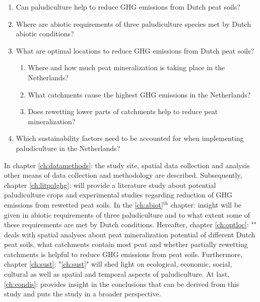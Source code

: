 \documentclass[a4paper,12pt]{scrbook}
\newcommand{\sur}[1]{\ensuremath{^{\textrm{#1}}}}
\begin{document}
\begin{enumerate}
\item \label{rq:pallit} {Can paludiculture help to reduce GHG emissions from Dutch peat soils?} 
\item \label{rq:abiot} {Where are abiotic requirements of three paludiculture species met by Dutch abiotic conditions?}
\item \label{rq:gisoptloc} {What are optimal locations to reduce GHG emissions from Dutch peat soils?}
\begin{enumerate}
\item \label{rqsub:peatmineral} {Where and how much peat mineralization is taking place in the Netherlands?}
\item \label{rqsub:catchpeat} {What catchments cause the highest GHG emissions in the Netherlands?}
\item \label{rqsub:catchheigth} {Does rewetting lower parts of catchments help to reduce peat mineralization?}
\end{enumerate}
\label{rq:sust}\item{Which sustainability factors need to be accounted for when implementing paludiculture in the Netherlands?}
\end{enumerate}

In chapter \ref{ch:datamethods}:  the study site, spatial data collection and analysis other means of data collection and methodology are described. Subsequently, chapter \ref{ch:litpalghg}:  will provide a literature study about potential paludiculture crops and experimental studies regarding reduction of GHG emissions from rewetted peat soils. In the \ref{ch:abiot}\sur{th} chapter:  insight will be given in abiotic requirements of three paludiculture and to what extent some of these requirements are met by Dutch conditions. Hereafter, chapter \ref{ch:optloc}: "" deals with spatial analyses about peat mineralization potential of different Dutch peat soils, what catchments contain most peat and whether partially rewetting catchments is helpful to reduce GHG emissions from peat soils. Furthermore, chapter \ref{ch:sust}: "\ref{ch:sust}" will shed light on ecological, economic, social, cultural as well as spatial and temporal aspects of paludiculture. At last, \ref{ch:condis}:  provides insight in the conclusions that can be derived from this study and puts the study in a broader perspective.
\end{document}
